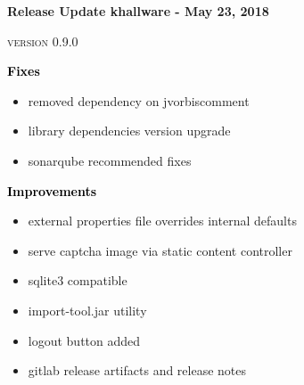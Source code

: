 \documentclass[notitlepage]{article}
\newcommand{\releasedate}{May 23, 2018}
\begin{document}
\Huge\textbf{\textcolor{myblue}{Release Update khallware - \releasedate{}}}

\small\textsc{version 0.9.0}

\vspace{25px}

\LARGE\textbf{\textcolor{black}{Fixes}}
\normalsize
\begin{center}
\begin{itemize}[label=\raisebox{0.25ex}{\tiny$\bullet$}]
\item removed dependency on jvorbiscomment
\item library dependencies version upgrade
\item sonarqube recommended fixes
\end{itemize}
\end{center}

\vspace{25px}

\LARGE\textbf{\textcolor{black}{Improvements}}
\normalsize
\begin{center}
\begin{itemize}[label=\raisebox{0.25ex}{\tiny$\bullet$}]
\item external properties file overrides internal defaults
\item serve captcha image via static content controller
\item sqlite3 compatible
\item import-tool.jar utility
\item logout button added
\item gitlab release artifacts and release notes
\end{itemize}
\end{center}
\end{document}
